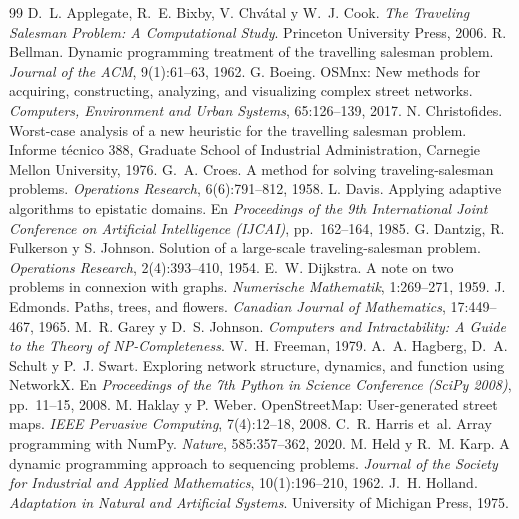 \clearpage
{}
\begin{thebibliography}{99}
\small\setlength{\itemsep}{0.2em}
 D.~L. Applegate, R.~E. Bixby, V. Chvátal y W.~J. Cook. \emph{The Traveling Salesman Problem: A Computational Study}. Princeton University Press, 2006.
 R. Bellman. Dynamic programming treatment of the travelling salesman problem. \emph{Journal of the ACM}, 9(1):61--63, 1962.
 G. Boeing. OSMnx: New methods for acquiring, constructing, analyzing, and visualizing complex street networks. \emph{Computers, Environment and Urban Systems}, 65:126--139, 2017.
 N. Christofides. Worst-case analysis of a new heuristic for the travelling salesman problem. Informe técnico 388, Graduate School of Industrial Administration, Carnegie Mellon University, 1976.
 G.~A. Croes. A method for solving traveling-salesman problems. \emph{Operations Research}, 6(6):791--812, 1958.
 L. Davis. Applying adaptive algorithms to epistatic domains. En \emph{Proceedings of the 9th International Joint Conference on Artificial Intelligence (IJCAI)}, pp.\ 162--164, 1985.
 G. Dantzig, R. Fulkerson y S. Johnson. Solution of a large-scale traveling-salesman problem. \emph{Operations Research}, 2(4):393--410, 1954.
 E.~W. Dijkstra. A note on two problems in connexion with graphs. \emph{Numerische Mathematik}, 1:269--271, 1959.
 J. Edmonds. Paths, trees, and flowers. \emph{Canadian Journal of Mathematics}, 17:449--467, 1965.
 M.~R. Garey y D.~S. Johnson. \emph{Computers and Intractability: A Guide to the Theory of NP-Completeness}. W.~H. Freeman, 1979.
 A.~A. Hagberg, D.~A. Schult y P.~J. Swart. Exploring network structure, dynamics, and function using NetworkX. En \emph{Proceedings of the 7th Python in Science Conference (SciPy 2008)}, pp.\ 11--15, 2008.
 M. Haklay y P. Weber. OpenStreetMap: User-generated street maps. \emph{IEEE Pervasive Computing}, 7(4):12--18, 2008.
 C.~R. Harris et~al. Array programming with NumPy. \emph{Nature}, 585:357--362, 2020.
 M. Held y R.~M. Karp. A dynamic programming approach to sequencing problems. \emph{Journal of the Society for Industrial and Applied Mathematics}, 10(1):196--210, 1962.
 J.~H. Holland. \emph{Adaptation in Natural and Artificial Systems}. University of Michigan Press, 1975.

\end{thebibliography}
